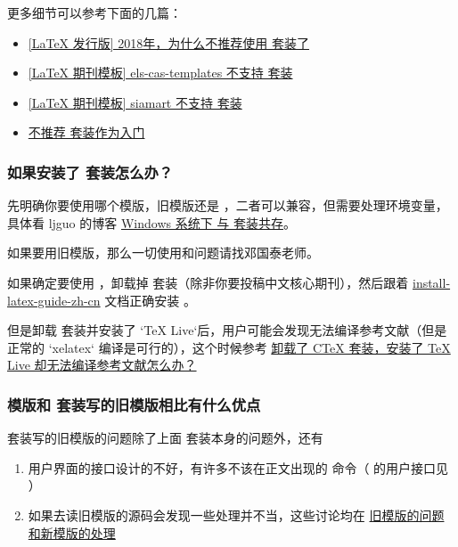 更多细节可以参考下面的几篇：

\begin{itemize}
  \item \href{https://zhuanlan.zhihu.com/p/45174503}{[LaTeX 发行版] 2018年，为什么不推荐使用 \CTeX 套装了}
  \item \href{https://zhuanlan.zhihu.com/p/73304856}{[LaTeX 期刊模板] els-cas-templates 不支持 \CTeX 套装}
  \item \href{https://zhuanlan.zhihu.com/p/112637535}{[LaTeX 期刊模板] siamart 不支持 \CTeX 套装}
  \item \href{https://tieba.baidu.com/p/2665622350}{不推荐 \CTeX 套装作为入门}
\end{itemize}


\subsubsection{如果安装了 \CTeX 套装怎么办？}

先明确你要使用哪个模版，旧模版还是 ，二者可以兼容，但需要处理环境变量，具体看 ljguo 的博客 \href{https://ljguo1020.github.io/2022/06/09/texlive-and-ctex/}{Windows 系统下 \TeXLive 与 \CTeX 套装共存}。

如果要用旧模版，那么一切使用和问题请找邓国泰老师。

如果确定要使用 ，卸载掉 \CTeX 套装（除非你要投稿中文核心期刊），然后跟着 \href{https://gitee.com/OsbertWang/install-latex-guide-zh-cn/releases}{install-latex-guide-zh-cn} 文档正确安装 \TeXLive 。


但是卸载 \CTeX 套装并安装了 `TeX Live`后，用户可能会发现无法编译参考文献（但是正常的 `xelatex` 编译是可行的），这个时候参考
\href{https://gitee.com/xkwxdyy/CCNUthesis/wikis/%E5%8D%B8%E8%BD%BD%E4%BA%86CTeX%E5%A5%97%E8%A3%85%E5%AE%89%E8%A3%85%E4%BA%86TeXLive%E5%8D%B4%E6%97%A0%E6%B3%95%E7%BC%96%E8%AF%91%E5%8F%82%E8%80%83%E6%96%87%E7%8C%AE}{卸载了 CTeX 套装，安装了 TeX Live 却无法编译参考文献怎么办？}


\subsubsection{ 模版和 \CTeX 套装写的旧模版相比有什么优点}

\CTeX 套装写的旧模版的问题除了上面 \CTeX 套装本身的问题外，还有
\begin{enumerate}
  \item 用户界面的接口设计的不好，有许多不该在正文出现的  命令（ 的用户接口见 ）
  \item 如果去读旧模版的源码会发现一些处理并不当，这些讨论均在 \href{https://gitee.com/xkwxdyy/CCNUthesis/wikis/%E6%97%A7%E6%A8%A1%E7%89%88%E7%9A%84%E9%97%AE%E9%A2%98%E5%92%8C%E6%96%B0%E6%A8%A1%E7%89%88%E7%9A%84%E5%A4%84%E7%90%86}{旧模版的问题和新模版的处理}
\end{enumerate}

